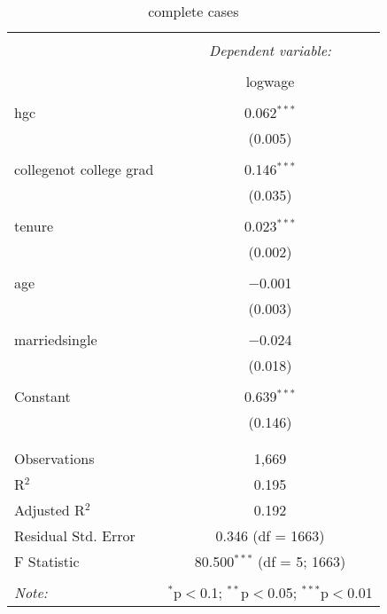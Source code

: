 \documentclass{article}
\begin{document}
\begin{table}[!htbp] \centering
  \caption{complete cases}
  \label{}
\begin{tabular}{@{\extracolsep{5pt}}lc}
\\[-1.8ex]\hline
\hline \\[-1.8ex]
 & \multicolumn{1}{c}{\textit{Dependent variable:}} \\
\cline{2-2}
\\[-1.8ex] & logwage \\
\hline \\[-1.8ex]
 hgc & 0.062$^{***}$ \\
  & (0.005) \\
  & \\
 collegenot college grad & 0.146$^{***}$ \\
  & (0.035) \\
  & \\
 tenure & 0.023$^{***}$ \\
  & (0.002) \\
  & \\
 age & $-$0.001 \\
  & (0.003) \\
  & \\
 marriedsingle & $-$0.024 \\
  & (0.018) \\
  & \\
 Constant & 0.639$^{***}$ \\
  & (0.146) \\
  & \\
\hline \\[-1.8ex]
Observations & 1,669 \\
R$^{2}$ & 0.195 \\
Adjusted R$^{2}$ & 0.192 \\
Residual Std. Error & 0.346 (df = 1663) \\
F Statistic & 80.500$^{***}$ (df = 5; 1663) \\
\hline
\hline \\[-1.8ex]
\textit{Note:}  & \multicolumn{1}{r}{$^{*}$p$<$0.1; $^{**}$p$<$0.05; $^{***}$p$<$0.01} \\
\end{tabular}
\end{table}
\end{document}
